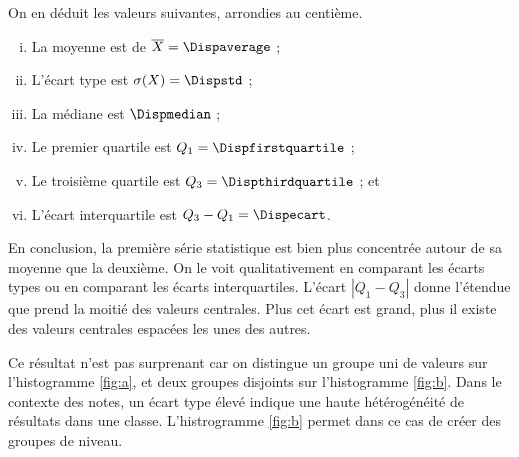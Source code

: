{	On en déduit les valeurs suivantes, arrondies au centième.
	\begin{enumerate}[i)]
		\item La moyenne est de $\overline{X} = \Dispaverage$ ;
		\item L'écart type est $\sigma(X) = \Dispstd$ ;
		\item La médiane est $\Dispmedian$ ;
		\item Le premier quartile est $Q_1 = \Dispfirstquartile$ ;
		\item Le troisième quartile est $Q_3 = \Dispthirdquartile$ ; et
		\item L'écart interquartile est $Q_3 - Q_1 = \Dispecart$.
	\end{enumerate}


	En conclusion, la première série statistique est bien plus concentrée autour de sa moyenne que la deuxième.
	On le voit qualitativement en comparant les écarts types ou en comparant les écarts interquartiles.
	L'écart $|Q_1 - Q_3|$ donne l'étendue que prend la moitié des valeurs centrales. 
	Plus cet écart est grand, plus il existe des valeurs centrales espacées les unes des autres.
	
	Ce résultat n'est pas surprenant car on distingue un groupe uni de valeurs sur l'histogramme \ref{fig:a}, et deux groupes disjoints sur l'histogramme \ref{fig:b}.
	Dans le contexte des notes, un écart type élevé indique une haute hétérogénéité de résultats dans une classe. 
	L'histrogramme \ref{fig:b} permet dans ce cas de créer des groupes de niveau.
}

\ifsolutions
\newpage
\fi

